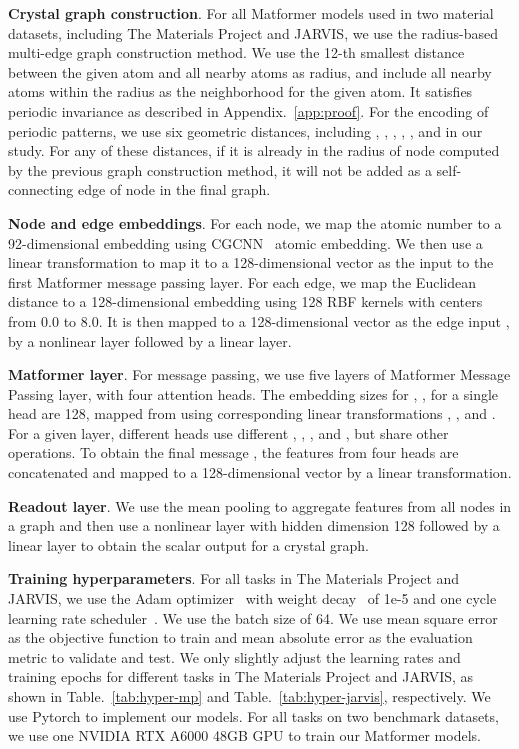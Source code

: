 \documentclass{article}
\begin{document}
\textbf{Crystal graph construction}. For all Matformer models used in two material datasets,  including The Materials Project and JARVIS, we use the radius-based multi-edge graph construction method. We use the 12-th smallest distance between the given atom and all nearby atoms as radius, and include all nearby atoms within the radius as the neighborhood for the given atom. It satisfies periodic invariance as described in Appendix.~\ref{app:proof}. For the encoding of periodic patterns, we use six geometric distances, including , , ,
, , and 
in our study. For any of these distances, if it is already in the radius of node  computed by the previous graph construction method, it will not be added as a self-connecting edge of node  in the final graph.

\textbf{Node and edge embeddings}. For each node, we map the atomic number to a 92-dimensional embedding using CGCNN~\citep{cgcnn} atomic embedding. We then use a linear transformation to map it to a 128-dimensional vector as the input  to the first Matformer message passing layer. For each edge, we map the Euclidean distance to a 128-dimensional embedding using 128 RBF kernels with centers from 0.0 to 8.0. 
It is then mapped to a 128-dimensional vector as the edge input , by a nonlinear layer followed by a linear layer.

\textbf{Matformer layer}. For message passing,
we use five layers of Matformer Message Passing layer, with four attention heads. The embedding sizes for , ,   for a single head are 128, mapped from  using corresponding linear transformations , , and .
For a given layer, different heads use different , , , and , but share other operations. To obtain the final message , the features from four heads are concatenated and mapped to a 128-dimensional vector by a linear transformation.

\textbf{Readout layer}. We use the mean pooling to aggregate features from all nodes in a graph and then use a nonlinear layer with hidden dimension 128 followed by a linear layer to obtain the scalar output for a crystal graph.

\textbf{Training hyperparameters}. For all tasks in The Materials Project and JARVIS, we use the Adam optimizer~\citep{kingma2015adam} with weight decay~\citep{weightdecay} of 1e-5 and one cycle learning rate scheduler~\citep{onecycle}. We use the batch size of 64. We use mean square error as the objective function to train and mean absolute error as the evaluation metric to validate and test. We only slightly adjust the learning rates and training epochs for different tasks in The Materials Project and JARVIS, as shown in Table.~\ref{tab:hyper-mp} and Table.~\ref{tab:hyper-jarvis}, respectively. We use Pytorch to implement our models. For all tasks on two benchmark datasets, we use one NVIDIA RTX A6000 48GB GPU to train our Matformer models. 
\end{document}
